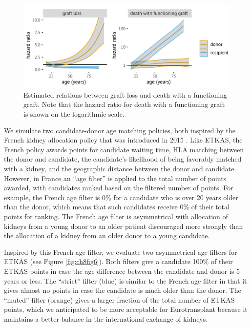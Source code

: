 \documentclass[11pt,twoside,]{book}
\begin{document}
\begin{figure}[ht]

{\centering \includegraphics[width=1\linewidth]{figures/ch8//fig5-competing_risk_model} 

}

\caption{Estimated relations between graft loss and death with a functioning graft. Note that the hazard ratio for death with a functioning graft is shown on the logarithmic scale.}\label{fig:ch8fig5}
\end{figure}

We simulate two candidate-donor age matching policies, both
inspired by the French kidney allocation policy that was introduced in 2015
\citep{Audry2022}. Like ETKAS, the French policy awards
points for candidate waiting time, HLA matching between the donor and candidate,
the candidate's likelihood of being favorably matched with a kidney, and the geographic distance
between the donor and candidate. However, in France an ``age filter'' is
applied to the total number of points awarded, with candidates ranked based on
the filtered number of points. For example, the French age filter is 0\%
for a candidate who is over 20 years older than the donor, which
means that such candidates receive 0\% of their total points for ranking.
The French age filter is asymmetrical with allocation of kidneys from
a young donor to an older patient discouraged more strongly than
the allocation of a kidney from an older donor to a young candidate.

Inspired by this French age filter, we evaluate two asymmetrical age filters for ETKAS
(see Figure \ref{fig:ch8fig6}). Both filters give a candidate 100\%
of their ETKAS points in case the age difference between the candidate and donor is 5 years or less. The ``strict'' filter (blue) is similar to the
French age filter in that it gives almost no points in case the
candidate is much older than the donor. The ``muted'' filter (orange)
gives a larger fraction of the total number of ETKAS points, which we
anticipated to be more acceptable for Eurotransplant because it
maintains a better balance in the international exchange of kidneys.
\end{document}
